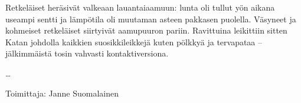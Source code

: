 \begin{multicols}{2}
	Retkeläiset heräsivät valkeaan lauantaiaamuun: lunta oli tullut yön aikana
	useampi sentti ja lämpötila oli muutaman asteen pakkasen puolella. Väsyneet ja
	kohmeiset retkeläiset siirtyivät aamupuuron pariin. Ravittuina leikittiin
	sitten Katan johdolla kaikkien suosikkileikkejä kuten pölkkyä ja tervapataa --
	jälkimmäistä tosin vahvasti kontaktiversiona.

	\ldots

	\raggedleft Toimittaja: Janne Suomalainen\\

\end{multicols}


